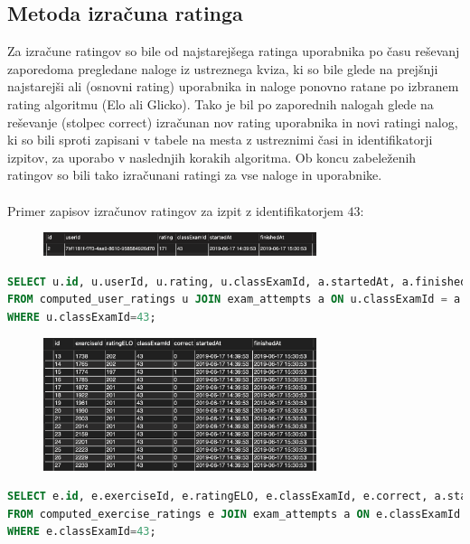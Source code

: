 \documentclass{IEEEtran}
\makeatletter
\let\old@subsection\subsection
\renewcommand{\subsection}[1]{\bigskip\old@subsection{#1}\@afterindentfalse\@afterheading}
\makeatother
\begin{document}
\subsection{Metoda izračuna ratinga}

Za izračune ratingov so bile od najstarejšega ratinga uporabnika po času reševanj zaporedoma pregledane naloge iz ustreznega kviza, ki so bile glede na prejšnji najstarejši ali (osnovni rating) uporabnika in naloge ponovno ratane po izbranem rating algoritmu (Elo ali Glicko). Tako je bil po zaporednih nalogah glede na reševanje (stolpec correct) izračunan nov rating uporabnika in novi ratingi nalog, ki so bili sproti zapisani v tabele na mesta z ustreznimi časi in identifikatorji izpitov, za uporabo v naslednjih korakih algoritma. Ob koncu zabeleženih ratingov so bili tako izračunani ratingi za vse naloge in uporabnike.
\hfill
\\
\\
Primer zapisov izračunov ratingov za izpit z identifikatorjem $43$:

\lstset{basicstyle=\tiny,style=SQLstyle}
\begin{figure}[h!]
    \includegraphics[width=8cm]{PrimerTabeleUser}
    \label{fig:example}%
\end{figure}

\begin{lstlisting}[language=SQL]
SELECT u.id, u.userId, u.rating, u.classExamId, a.startedAt, a.finishedAt 
FROM computed_user_ratings u JOIN exam_attempts a ON u.classExamId = a.classExamId 
WHERE u.classExamId=43;
\end{lstlisting}

\begin{figure}[h!]
    \includegraphics[width=8cm]{PrimerTabele}
    \label{fig:example}%
\end{figure}
\begin{lstlisting}[language=SQL]
SELECT e.id, e.exerciseId, e.ratingELO, e.classExamId, e.correct, a.startedAt, a.finishedAt 
FROM computed_exercise_ratings e JOIN exam_attempts a ON e.classExamId = a.classExamId 
WHERE e.classExamId=43;
\end{lstlisting}
\end{document}
